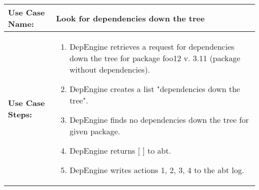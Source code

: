 \newpage
\begin{tabularx}{\linewidth}{|l|X|}
\hline
\textbf{Use Case Name:} & \textbf{Look for dependencies down the tree} \\
\hline
\textbf{Use Case Steps:} & 
\begin{minipage}{\linewidth} 
 \vspace{0.05em}
  \begin{enumerate}
   \item DepEngine retrieves a request for dependencies down the tree for package foo12 v. 3.11 (package without dependencies).
   \item DepEngine creates a list "dependencies down the tree".
   \item DepEngine finds no dependencies down the tree for given package.   
   \item DepEngine returns [ ] to abt.
   \item DepEngine writes actions 1, 2, 3, 4 to the abt log.
  \end{enumerate}
 \vspace{0.05em}
\end{minipage}
\\
\hline 
\end{tabularx}
